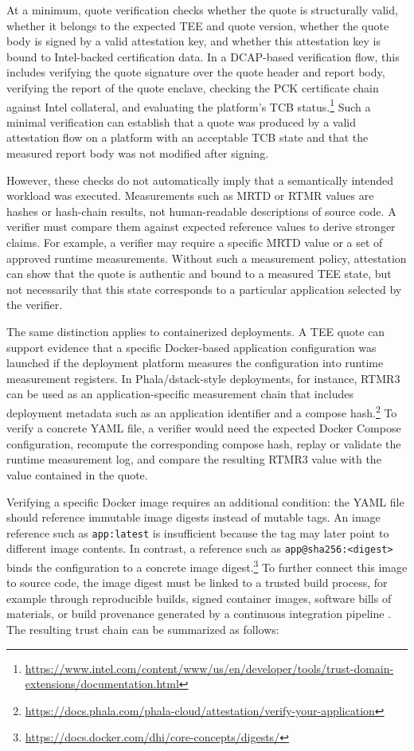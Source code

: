 At a minimum, quote verification checks whether the quote is structurally valid, whether it belongs to the expected \ac{TEE} and quote version, whether the quote body is signed by a valid attestation key, and whether this attestation key is bound to Intel-backed certification data. In a \ac{DCAP}-based verification flow, this includes verifying the quote signature over the quote header and report body, verifying the report of the quote enclave, checking the \ac{PCK} certificate chain against Intel collateral, and evaluating the platform's \ac{TCB} status.\footnote{\url{https://www.intel.com/content/www/us/en/developer/tools/trust-domain-extensions/documentation.html}} Such a minimal verification can establish that a quote was produced by a valid attestation flow on a platform with an acceptable \ac{TCB} state and that the measured report body was not modified after signing.

However, these checks do not automatically imply that a semantically intended workload was executed. Measurements such as \ac{MRTD} or \ac{RTMR} values are hashes or hash-chain results, not human-readable descriptions of source code. A verifier must compare them against expected reference values to derive stronger claims. For example, a verifier may require a specific \ac{MRTD} value or a set of approved runtime measurements. Without such a measurement policy, attestation can show that the quote is authentic and bound to a measured TEE state, but not necessarily that this state corresponds to a particular application selected by the verifier.

The same distinction applies to containerized deployments. A TEE quote can support evidence that a specific Docker-based application configuration was launched if the deployment platform measures the configuration into runtime measurement registers. In Phala/dstack-style deployments, for instance, \ac{RTMR}3 can be used as an application-specific measurement chain that includes deployment metadata such as an application identifier and a compose hash.\footnote{\url{https://docs.phala.com/phala-cloud/attestation/verify-your-application}} To verify a concrete YAML file, a verifier would need the expected Docker Compose configuration, recompute the corresponding compose hash, replay or validate the runtime measurement log, and compare the resulting \ac{RTMR}3 value with the value contained in the quote.

Verifying a specific Docker image requires an additional condition: the YAML file should reference immutable image digests instead of mutable tags. An image reference such as \texttt{app:latest} is insufficient because the tag may later point to different image contents. In contrast, a reference such as \texttt{app@sha256:<digest>} binds the configuration to a concrete image digest.\footnote{\url{https://docs.docker.com/dhi/core-concepts/digests/}} To further connect this image to source code, the image digest must be linked to a trusted build process, for example through reproducible builds, signed container images, software bills of materials, or build provenance generated by a continuous integration pipeline \cite{236322}. The resulting trust chain can be summarized as follows:

